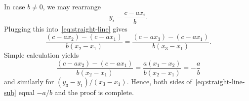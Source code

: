 In case $b \neq 0$, we may rearrange
\[
 y_i = \frac{c - ax_i}{b}.
\]
Plugging this into~\eqref{eq:straight-line} gives
\begin{equation}
 \label{eq:straight-line-sub}
 \frac{(c - ax_2) - (c - ax_1)}{b(x_2 - x_1)} = \frac{(c - ax_3) - (c -
 ax_1)}{b(x_3 - x_1)}.
\end{equation}
Simple calculation yields
\[
 \frac{(c - ax_2) - (c - ax_1)}{b(x_2 - x_1)} = \frac{a(x_1 - x_2)}{b(x_2 -
 x_1)} = - \frac{a}{b}
\]
and similarly for $(y_3 - y_1) / (x_3 - x_1)$. Hence, both sides
of~\eqref{eq:straight-line-sub} equal $-a / b$ and the proof is complete.


